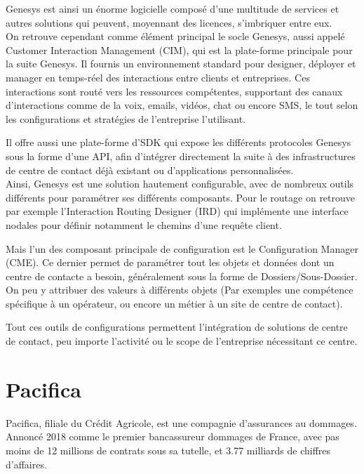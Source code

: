 \documentclass{rapport}
\begin{document}
Genesys est ainsi un énorme logicielle composé d'une multitude de services et autres solutions qui peuvent, moyennant des licences, s'imbriquer entre eux.\\

On retrouve cependant comme élément principal le socle Genesys, aussi appelé Customer Interaction Management (CIM), qui est la plate-forme principale pour la suite Genesys. Il fournis un environnement standard pour designer, déployer et manager en temps-réel des interactions entre clients et entreprises.
Ces interactions sont routé vers les ressources compétentes, supportant des canaux d'interactions comme de la voix, emails, vidéos, chat ou encore SMS, le tout selon les configurations et stratégies de l'entreprise l'utilisant.

Il offre aussi une plate-forme d'SDK qui expose les différents protocoles Genesys sous la forme d'une API, afin d'intégrer directement la suite à des infrastructures de centre de contact déjà existant ou d'applications personnalisées.\\

Ainsi, Genesys est une solution hautement configurable, avec de nombreux outils différents pour paramétrer ses différents composants. Pour le routage on retrouve par exemple l'Interaction Routing Designer (IRD) qui implémente une interface nodales pour définir notamment le chemins d'une requête client.

Mais l'un des composant principale de configuration est le Configuration Manager (CME). Ce dernier permet de paramétrer tout les objets et données dont un centre de contacte a besoin, généralement sous la forme de Dossiers/Sous-Dossier. On peu y attribuer des valeurs à différents objets (Par exemples une compétence spécifique à un opérateur, ou encore un métier à un site de centre de contact).


Tout ces outils de configurations permettent l'intégration de solutions de centre de contact, peu importe l'activité ou le scope de l'entreprise nécessitant ce centre.

\newpage

\section{Pacifica}

Pacifica, filiale du Crédit Agricole, est une compagnie d'assurances au dommages. Annoncé 2018 comme le premier bancassureur dommages de France, avec pas moins de 12 millions de contrats sous sa tutelle, et 3.77 milliards de chiffres d'affaires.\\
\end{document}
